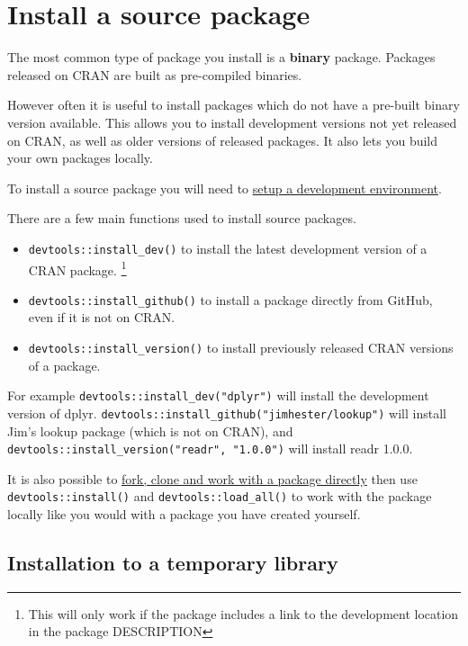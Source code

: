 \documentclass[
  letterpaper,
]{book}
\providecommand{\tightlist}{%
  \setlength{\itemsep}{0pt}\setlength{\parskip}{0pt}}\usepackage{longtable,booktabs,array}
\begin{document}
\hypertarget{install-a-source-package}{%
\chapter{Install a source package}\label{install-a-source-package}}

The most common type of package you install is a \textbf{binary}
package. Packages released on CRAN are built as pre-compiled binaries.

However often it is useful to install packages which do not have a
pre-built binary version available. This allows you to install
development versions not yet released on CRAN, as well as older versions
of released packages. It also lets you build your own packages locally.

To install a source package you will need to
\protect\hyperlink{setup-an-r-dev-environment}{setup a development
environment}.

There are a few main functions used to install source packages.

\begin{itemize}
\tightlist
\item
  \texttt{devtools::install\_dev()} to install the latest development
  version of a CRAN package. \footnote{This will only work if the
    package includes a link to the development location in the package
    DESCRIPTION}
\item
  \texttt{devtools::install\_github()} to install a package directly
  from GitHub, even if it is not on CRAN.
\item
  \texttt{devtools::install\_version()} to install previously released
  CRAN versions of a package.
\end{itemize}

For example \texttt{devtools::install\_dev("dplyr")} will install the
development version of dplyr.
\texttt{devtools::install\_github("jimhester/lookup")} will install
Jim's lookup package (which is not on CRAN), and
\texttt{devtools::install\_version("readr",\ "1.0.0")} will install
readr 1.0.0.

It is also possible to \href{https://happygitwithr.com/fork.html}{fork,
clone and work with a package directly} then use
\texttt{devtools::install()} and \texttt{devtools::load\_all()} to work
with the package locally like you would with a package you have created
yourself.

\hypertarget{installation-to-a-temporary-library}{%
\section{Installation to a temporary
library}\label{installation-to-a-temporary-library}}
\end{document}
